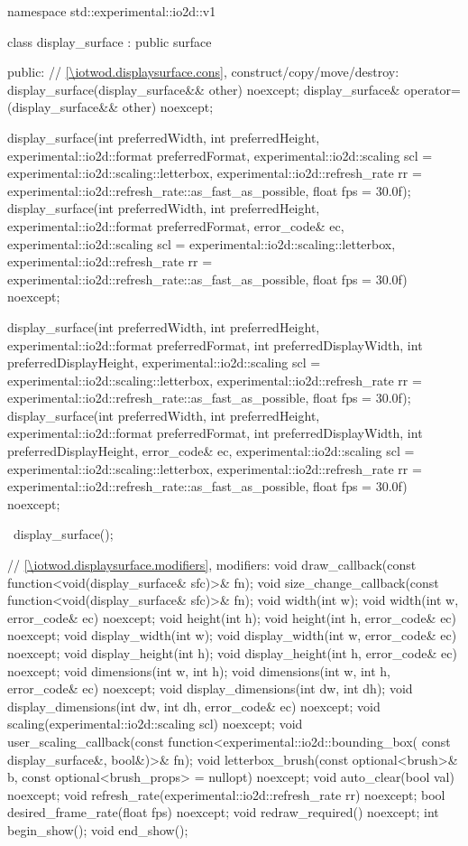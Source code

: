\begin{codeblock}
namespace std::experimental::io2d::v1 {
  class display_surface : public surface {
  public:
    // \ref{\iotwod.displaysurface.cons}, construct/copy/move/destroy:
    display_surface(display_surface&& other) noexcept;
    display_surface& operator=(display_surface&& other) noexcept;
    
    display_surface(int preferredWidth, int preferredHeight, 
      experimental::io2d::format preferredFormat,
      experimental::io2d::scaling scl = experimental::io2d::scaling::letterbox,
      experimental::io2d::refresh_rate rr =
      experimental::io2d::refresh_rate::as_fast_as_possible, float fps = 30.0f);
    display_surface(int preferredWidth, int preferredHeight, 
      experimental::io2d::format preferredFormat, error_code& ec,
      experimental::io2d::scaling scl = experimental::io2d::scaling::letterbox,
      experimental::io2d::refresh_rate rr =
      experimental::io2d::refresh_rate::as_fast_as_possible, float fps = 30.0f) 
      noexcept;
    
    display_surface(int preferredWidth, int preferredHeight, 
      experimental::io2d::format preferredFormat,
      int preferredDisplayWidth, int preferredDisplayHeight,
      experimental::io2d::scaling scl = experimental::io2d::scaling::letterbox,
      experimental::io2d::refresh_rate rr =
      experimental::io2d::refresh_rate::as_fast_as_possible, float fps = 30.0f);
    display_surface(int preferredWidth, int preferredHeight, 
      experimental::io2d::format preferredFormat,
      int preferredDisplayWidth, int preferredDisplayHeight, error_code& ec,
      experimental::io2d::scaling scl = experimental::io2d::scaling::letterbox,
      experimental::io2d::refresh_rate rr =
      experimental::io2d::refresh_rate::as_fast_as_possible, float fps = 30.0f) 
      noexcept;
    
    ~display_surface();
    
    // \ref{\iotwod.displaysurface.modifiers}, modifiers:
    void draw_callback(const function<void(display_surface& sfc)>& fn);
    void size_change_callback(const function<void(display_surface& sfc)>& fn);
    void width(int w);
    void width(int w, error_code& ec) noexcept;
    void height(int h);
    void height(int h, error_code& ec) noexcept;
    void display_width(int w);
    void display_width(int w, error_code& ec) noexcept;
    void display_height(int h);
    void display_height(int h, error_code& ec) noexcept;
    void dimensions(int w, int h);
    void dimensions(int w, int h, error_code& ec) noexcept;
    void display_dimensions(int dw, int dh);
    void display_dimensions(int dw, int dh, error_code& ec) noexcept;
    void scaling(experimental::io2d::scaling scl) noexcept;
    void user_scaling_callback(const function<experimental::io2d::bounding_box(
      const display_surface&, bool&)>& fn);
    void letterbox_brush(const optional<brush>& b,
      const optional<brush_props> = nullopt) noexcept;
    void auto_clear(bool val) noexcept;
    void refresh_rate(experimental::io2d::refresh_rate rr) noexcept;
    bool desired_frame_rate(float fps) noexcept;
    void redraw_required() noexcept;
    int begin_show();
    void end_show();
    
}}
\end{codeblock}
